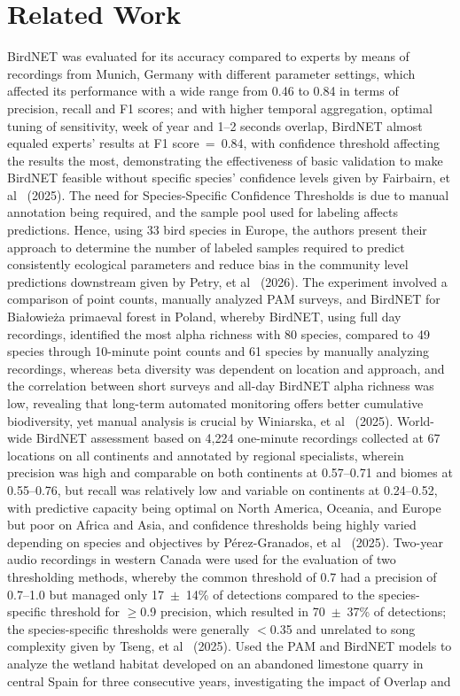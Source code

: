\documentclass[conference]{IEEEtran}
\begin{document}
\section{Related Work}

BirdNET was evaluated for its accuracy compared to experts by means of recordings from Munich, Germany with different parameter settings, which affected its performance with a wide range from 0.46 to 0.84 in terms of precision, recall and F1 scores; and with higher temporal aggregation, optimal tuning of sensitivity, week of year and 1--2 seconds overlap, BirdNET almost equaled experts' results at F1 score~=~0.84, with confidence threshold affecting the results the most, demonstrating the effectiveness of basic validation to make BirdNET feasible without specific species' confidence levels given by Fairbairn, et al~\cite{b9} (2025). The need for Species-Specific Confidence Thresholds is due to manual annotation being required, and the sample pool used for labeling affects predictions. Hence, using 33 bird species in Europe, the authors present their approach to determine the number of labeled samples required to predict consistently ecological parameters and reduce bias in the community level predictions downstream given by Petry, et al~\cite{b10} (2026). The experiment involved a comparison of point counts, manually analyzed PAM surveys, and BirdNET for Bia\l{}owie\.{z}a primaeval forest in Poland, whereby BirdNET, using full day recordings, identified the most alpha richness with 80 species, compared to 49 species through 10-minute point counts and 61 species by manually analyzing recordings, whereas beta diversity was dependent on location and approach, and the correlation between short surveys and all-day BirdNET alpha richness was low, revealing that long-term automated monitoring offers better cumulative biodiversity, yet manual analysis is crucial by Winiarska, et al~\cite{b11} (2025). World-wide BirdNET assessment based on 4,224 one-minute recordings collected at 67 locations on all continents and annotated by regional specialists, wherein precision was high and comparable on both continents at 0.57--0.71 and biomes at 0.55--0.76, but recall was relatively low and variable on continents at 0.24--0.52, with predictive capacity being optimal on North America, Oceania, and Europe but poor on Africa and Asia, and confidence thresholds being highly varied depending on species and objectives by P\'{e}rez-Granados, et al~\cite{b12} (2025). Two-year audio recordings in western Canada were used for the evaluation of two thresholding methods, whereby the common threshold of 0.7 had a precision of 0.7--1.0 but managed only 17~$\pm$~14\% of detections compared to the species-specific threshold for $\geq$0.9 precision, which resulted in 70~$\pm$~37\% of detections; the species-specific thresholds were generally $<$0.35 and unrelated to song complexity given by Tseng, et al~\cite{b13} (2025). Used the PAM and BirdNET models to analyze the wetland habitat developed on an abandoned limestone quarry in central Spain for three consecutive years, investigating the impact of Overlap and 
\end{document}
